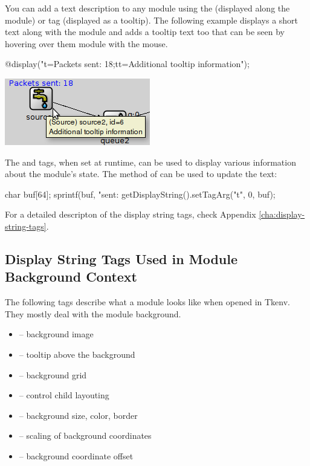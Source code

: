 You can add a text description to any module using the 
(displayed along the module) or  tag (displayed as a tooltip).
The following example displays a short text along with the module
and adds a tooltip text too that can be seen by hovering over
them module with the mouse.

\begin{ned}
@display("t=Packets sent: 18;tt=Additional tooltip information");
\end{ned}

\begin{center}
\includegraphics{figures/graphics-ttag}
\end{center}

\begin{note}
  The  and  tags, when set at runtime, can be used to display
  various information about the module's state. The  method
  of  can be used to update the text:

  \begin{cpp}
char buf[64];
sprintf(buf, "sent: %
getDisplayString().setTagArg("t", 0, buf);
  \end{cpp}

\end{note}

For a detailed descripton of the display string tags, check
Appendix \ref{cha:display-string-tags}.

\subsection{Display String Tags Used in Module Background Context}

The following tags describe what a module looks like when opened in
Tkenv. They mostly deal with the module background.

\begin{itemize}
  \item {} -- background image
  \item {} -- tooltip above the background
  \item {} -- background grid
  \item {} -- control child layouting
  \item {} -- background size, color, border
  \item {} -- scaling of background coordinates
  \item {} -- background coordinate offset
\end{itemize}

